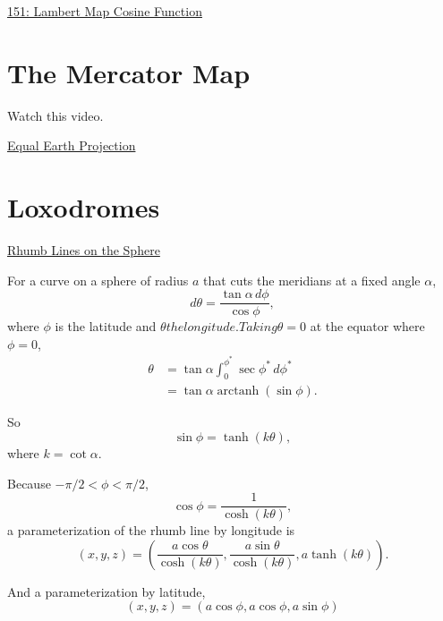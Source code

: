\documentclass{ximera}
\begin{document}
\begin{onlineOnly}
    \begin{center}
\end{center}
\end{onlineOnly}

\href{https://www.desmos.com/calculator/kbryuogdaj}{151: Lambert Map Cosine Function}



\section{The Mercator Map}

Watch this video.

\href{https://www.nytimes.com/2025/08/19/world/africa/africa-map-mercator.html}{Equal Earth Projection}


\section{Loxodromes}

\href{https://mathcurve.com/courbes3d.gb/loxodromie/sphereloxodromie.shtml}{Rhumb Lines on the Sphere}

For a curve on a sphere of radius $a$ that cuts the meridians at a fixed angle $\alpha$,
\[
  d\theta = \frac{\tan \alpha \, d\phi}{\cos\phi} ,
\]
where $\phi$ is the latitude and $\theta the longitude. Taking \theta = 0$ at the equator where $\phi=0$,
\begin{align*}
 \theta     &= \tan \alpha \int_0^{\phi^*} \sec \phi^* \, d\phi^*\\
               &= \tan \alpha \operatorname{arctanh}(\sin\phi) .
\end{align*}

So
\[
   \sin\phi = \operatorname{tanh}(k \theta),
\]
where $k=\cot\alpha$.

Because $-\pi/2 < \phi < \pi/2$,
\[
  \cos\phi =  \frac{1}{\cosh (k \theta)},
\]
a parameterization of the rhumb line by longitude is
\[
  (x,y,z) = \left( \frac{a\cos\theta}{\cosh(k\theta)} , \frac{a\sin\theta}{\cosh(k\theta)}  , a \tanh(k\theta)  \right) .
\]


And a parameterization by latitude,
\[
   (x,y,z) = \left(  a    \cos\phi  ,   a    \cos\phi    ,   a \sin \phi   \right)
\]

\begin{onlineOnly}
    \begin{center}
\end{center}
\end{onlineOnly}
\end{document}
